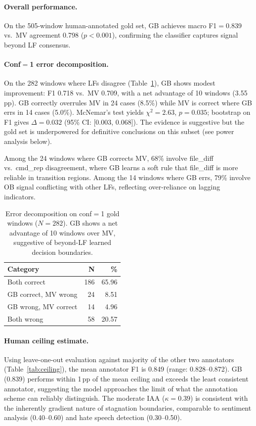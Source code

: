 \documentclass[11pt,a4paper]{article}
\begin{document}
\paragraph{Overall performance.}
On the 505-window human-annotated gold set, GB achieves macro F1${=}$0.839 vs.\ MV agreement 0.798 ($p{<}0.001$), confirming the classifier captures signal beyond LF consensus.

\paragraph{Conf${=}$1 error decomposition.}
On the 282 windows where LFs disagree (Table~\ref{tab:conf1}), GB shows modest improvement: F1 0.718 vs.\ MV 0.709, with a net advantage of 10 windows (3.55\,pp).
GB correctly overrules MV in 24 cases (8.5\%) while MV is correct where GB errs in 14 cases (5.0\%).
McNemar's test yields $\chi^2{=}2.63$, $p{=}0.035$; bootstrap on F1 gives $\Delta{=}0.032$ (95\% CI: [0.003, 0.068]).
The evidence is suggestive but the gold set is underpowered for definitive conclusions on this subset (see power analysis below).

Among the 24 windows where GB corrects MV, 68\% involve file\_diff vs.\ cmd\_rep disagreement, where GB learns a soft rule that file\_diff is more reliable in transition regions.
Among the 14 windows where GB errs, 79\% involve OB signal conflicting with other LFs, reflecting over-reliance on lagging indicators.

\begin{table}[t]
\centering
\small
\begin{tabular}{lrr}
\toprule
\textbf{Category} & \textbf{N} & \textbf{\%} \\
\midrule
Both correct & 186 & 65.96 \\
GB correct, MV wrong & 24 & 8.51 \\
GB wrong, MV correct & 14 & 4.96 \\
Both wrong & 58 & 20.57 \\
\bottomrule
\end{tabular}
\caption{Error decomposition on conf${=}$1 gold windows ($N{=}282$). GB shows a net advantage of 10 windows over MV, suggestive of beyond-LF learned decision boundaries.}
\label{tab:conf1}
\end{table}

\paragraph{Human ceiling estimate.}
Using leave-one-out evaluation against majority of the other two annotators (Table~\ref{tab:ceiling}), the mean annotator F1 is 0.849 (range: 0.828--0.872).
GB (0.839) performs within 1\,pp of the mean ceiling and exceeds the least consistent annotator, suggesting the model approaches the limit of what the annotation scheme can reliably distinguish.
The moderate IAA ($\kappa{=}0.39$) is consistent with the inherently gradient nature of stagnation boundaries, comparable to sentiment analysis (0.40--0.60) and hate speech detection (0.30--0.50).
\end{document}
